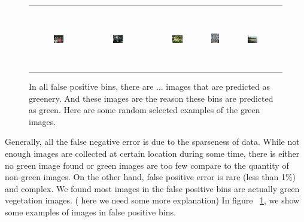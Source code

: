 \begin{figure}[th]
{{\begin{center}
\begin{tabular}{@{}c@{\,\,\,}c@{\,\,\,}c@{\,\,\,}c@{\,\,\,}c@{\,\,\,}}
\\[-6pt]
\hline
\\[-6pt]
\includegraphics[width=0.19\textwidth]{imggrid/falseposi/16.jpg} &
\includegraphics[width=0.19\textwidth]{imggrid/falseposi/17.jpg} &
\includegraphics[width=0.19\textwidth]{imggrid/falseposi/18.jpg} &
\includegraphics[height=1in]{imggrid/falseposi/19.jpg} &
\includegraphics[width=0.19\textwidth]{imggrid/falseposi/20.jpg} \\
\end{tabular}
\end{center}
}}
\caption{In all false positive bins, there are ... images that are predicted as greenery. And these images are the reason these bins are predicted as green. Here are some random selected examples of the green images.}
\label{fig:falseposi}
\end{figure}
Generally, all the false negative error is due to the sparseness of data. While not enough images are collected at certain location during some time, there is either no green image found or green images are too few compare to the quantity of non-green images. On the other hand, false positive error is rare (less than 1\%) and complex. We found most images in the false positive bins are actually green vegetation images. ( here we need some more explanation) In figure ~\ref{fig:falseposi}, we show some examples of images in false positive bins.




